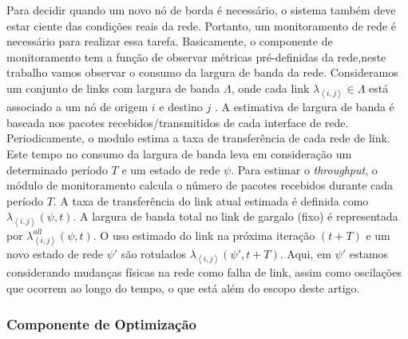 Para decidir quando um novo nó de borda é necessário, o sistema também deve estar ciente das condições reais da rede. Portanto, um monitoramento de rede é necessário para realizar essa tarefa.
Basicamente, o componente de monitoramento tem a função de observar métricas pré-definidas da rede,neste trabalho vamos observar o consumo da largura de banda da rede. 
Consideramos um conjunto de links com largura de banda $\Lambda$, onde cada link $\lambda_{\left \langle i,j \right \rangle} \in \Lambda$ está associado a um nó de origem $i$ e destino $j$ . A estimativa de largura de banda é baseada nos pacotes recebidos/transmitidos de cada interface de rede.
Periodicamente, o modulo estima a taxa de transferência de cada rede de link. Este tempo no consumo da largura de banda leva em consideração um determinado período $T$ e um estado de rede $\psi$.
%
Para estimar o \textit{throughput}, o módulo de monitoramento calcula o número de pacotes recebidos durante cada período $T$. A taxa de transferência do link atual estimada é definida como $\lambda_{\left \langle i,j \right \rangle}(\psi, t)$. A largura de banda total no link de gargalo (fixo) é representada por $\lambda^{all}_{\left \langle i,j \right \rangle}(\psi, t)$. O uso estimado do link na próxima iteração $(t+T)$ e um novo estado de rede $\psi'$ são rotulados $\lambda_{\left \langle i,j \right \rangle}(\psi', t+ T) $. Aqui, em $\psi'$ estamos considerando mudanças físicas na rede como falha de link, assim como oscilações que ocorrem ao longo do tempo, o que está além do escopo deste artigo.


\subsubsection*{Componente de Optimização}

